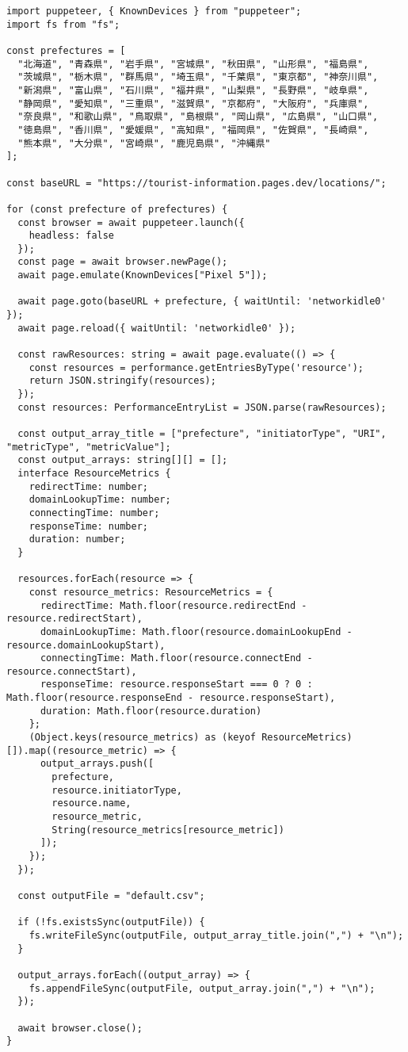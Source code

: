 \begin{lstlisting}[caption={PuppeteerとResource Timing APIを用いたページ読み込み時の画像の読み込み時間の計測},label={lst:PuppeteerとResource Timing APIを用いたページ読み込み時の画像の読み込み時間の計測}]
import puppeteer, { KnownDevices } from "puppeteer";
import fs from "fs";

const prefectures = [
  "北海道", "青森県", "岩手県", "宮城県", "秋田県", "山形県", "福島県",
  "茨城県", "栃木県", "群馬県", "埼玉県", "千葉県", "東京都", "神奈川県",
  "新潟県", "富山県", "石川県", "福井県", "山梨県", "長野県", "岐阜県",
  "静岡県", "愛知県", "三重県", "滋賀県", "京都府", "大阪府", "兵庫県",
  "奈良県", "和歌山県", "鳥取県", "島根県", "岡山県", "広島県", "山口県",
  "徳島県", "香川県", "愛媛県", "高知県", "福岡県", "佐賀県", "長崎県",
  "熊本県", "大分県", "宮崎県", "鹿児島県", "沖縄県"
];

const baseURL = "https://tourist-information.pages.dev/locations/";

for (const prefecture of prefectures) {
  const browser = await puppeteer.launch({
    headless: false
  });
  const page = await browser.newPage();
  await page.emulate(KnownDevices["Pixel 5"]);

  await page.goto(baseURL + prefecture, { waitUntil: 'networkidle0' });
  await page.reload({ waitUntil: 'networkidle0' });

  const rawResources: string = await page.evaluate(() => {
    const resources = performance.getEntriesByType('resource');
    return JSON.stringify(resources);
  });
  const resources: PerformanceEntryList = JSON.parse(rawResources);

  const output_array_title = ["prefecture", "initiatorType", "URI", "metricType", "metricValue"];
  const output_arrays: string[][] = [];
  interface ResourceMetrics {
    redirectTime: number;
    domainLookupTime: number;
    connectingTime: number;
    responseTime: number;
    duration: number;
  }

  resources.forEach(resource => {
    const resource_metrics: ResourceMetrics = {
      redirectTime: Math.floor(resource.redirectEnd - resource.redirectStart),
      domainLookupTime: Math.floor(resource.domainLookupEnd - resource.domainLookupStart),
      connectingTime: Math.floor(resource.connectEnd - resource.connectStart),
      responseTime: resource.responseStart === 0 ? 0 : Math.floor(resource.responseEnd - resource.responseStart),
      duration: Math.floor(resource.duration)
    };
    (Object.keys(resource_metrics) as (keyof ResourceMetrics)[]).map((resource_metric) => {
      output_arrays.push([
        prefecture,
        resource.initiatorType,
        resource.name,
        resource_metric,
        String(resource_metrics[resource_metric])
      ]);
    });
  });

  const outputFile = "default.csv";

  if (!fs.existsSync(outputFile)) {
    fs.writeFileSync(outputFile, output_array_title.join(",") + "\n");
  }

  output_arrays.forEach((output_array) => {
    fs.appendFileSync(outputFile, output_array.join(",") + "\n");
  });

  await browser.close();
}
\end{lstlisting}

